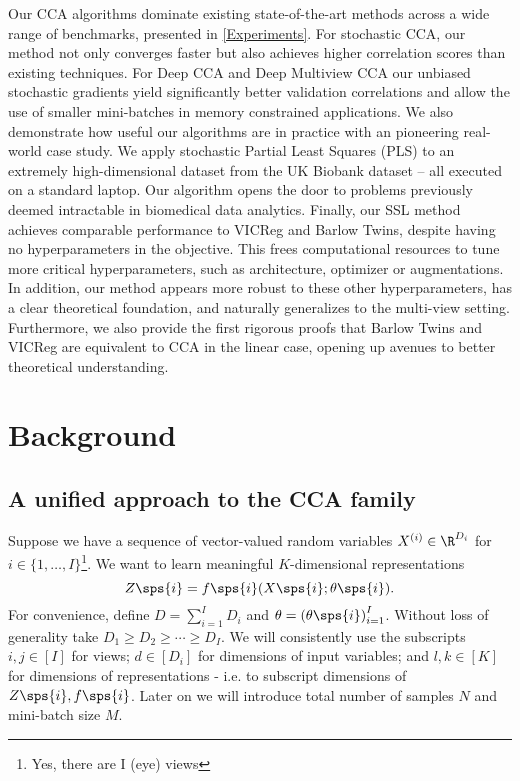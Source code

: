 Our CCA algorithms dominate existing state-of-the-art methods across a wide range of benchmarks, presented in \cref{Experiments}.
For stochastic CCA, our method not only converges faster but also achieves higher correlation scores than existing techniques.
For Deep CCA and Deep Multiview CCA our unbiased stochastic gradients yield significantly better validation correlations and allow the use of smaller mini-batches in memory constrained applications.
We also demonstrate how useful our algorithms are in practice with an pioneering real-world case study. We apply stochastic Partial Least Squares (PLS) to an extremely high-dimensional dataset from the UK Biobank dataset -- all executed on a standard laptop.
Our algorithm opens the door to problems previously deemed intractable in biomedical data analytics.
Finally, our SSL method achieves comparable performance to VICReg and Barlow Twins, despite having no hyperparameters in the objective.
This frees computational resources to tune more critical hyperparameters, such as architecture, optimizer or augmentations.
In addition, our method appears more robust to these other hyperparameters, has a clear theoretical foundation, and naturally generalizes to the multi-view setting.
Furthermore, we also provide the first rigorous proofs that Barlow Twins and VICReg are equivalent to CCA in the linear case, opening up avenues to better theoretical understanding.

\section{Background}
\subsection{A unified approach to the CCA family}\label{sec:background-unified}

Suppose we have a sequence of vector-valued random variables $X^{(i)} \in \R^{D_i}$ for $i \in \{1, \dots, I \}$\footnote{Yes, there are I (eye) views}.
We want to learn meaningful $K$-dimensional representations
\begin{equation}\label{eq:general-form-of-representations}
    Z\sps{i} = f\sps{i}( X\sps{i}; \theta\sps{i}).
\end{equation}
For convenience, define $D = \sum_{i=1}^I D_i$ and $\theta = \left(\theta\sps{i}\right)_{i=1}^I$.
Without loss of generality take $D_1 \geq D_2 \geq \cdots \geq D_I$.
We will consistently use the subscripts $i,j \in [I]$ for views;
$d \in [D_i]$ for dimensions of input variables;
and $l,k \in [K]$ for dimensions of representations - i.e. to subscript dimensions of $Z\sps{i}, f\sps{i}$.
Later on we will introduce total number of samples $N$ and mini-batch size $M$.

